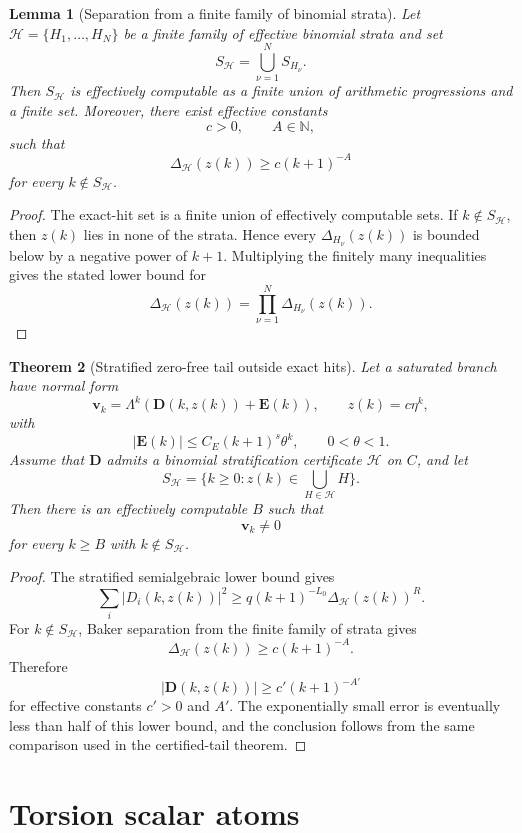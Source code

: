 \documentclass[11pt]{article}
\newtheorem{theorem}{Theorem}[section]
\newtheorem{lemma}[theorem]{Lemma}
\begin{document}
\begin{lemma}[Separation from a finite family of binomial strata]
Let \(\mathcal H=\{H_1,\ldots,H_N\}\) be a finite family of effective binomial strata and set
\[
S_{\mathcal H}=\bigcup_{\nu=1}^N S_{H_\nu}.
\]
Then \(S_{\mathcal H}\) is effectively computable as a finite union of arithmetic progressions and a finite set. Moreover, there exist effective constants
\[
c>0,
\qquad
A\in\mathbb N,
\]
such that
\[
\Delta_{\mathcal H}(z(k))\ge c(k+1)^{-A}
\]
for every \(k\notin S_{\mathcal H}\).
\end{lemma}

\begin{proof}
The exact-hit set is a finite union of effectively computable sets. If \(k\notin S_{\mathcal H}\), then \(z(k)\) lies in none of the strata. Hence every \(\Delta_{H_\nu}(z(k))\) is bounded below by a negative power of \(k+1\). Multiplying the finitely many inequalities gives the stated lower bound for
\[
\Delta_{\mathcal H}(z(k))
=
\prod_{\nu=1}^N\Delta_{H_\nu}(z(k)).
\]
\end{proof}

\begin{theorem}[Stratified zero-free tail outside exact hits]
Let a saturated branch have normal form
\[
\mathbf v_k=\Lambda^k(\mathbf D(k,z(k))+\mathbf E(k)),
\qquad
z(k)=c\eta^k,
\]
with
\[
|\mathbf E(k)|\le C_E(k+1)^s\theta^k,
\qquad
0<\theta<1.
\]
Assume that \(\mathbf D\) admits a binomial stratification certificate \(\mathcal H\) on \(C\), and let
\[
S_{\mathcal H}=\{k\ge0:z(k)\in\bigcup_{H\in\mathcal H}H\}.
\]
Then there is an effectively computable \(B\) such that
\[
\mathbf v_k\ne0
\]
for every \(k\ge B\) with \(k\notin S_{\mathcal H}\).
\end{theorem}

\begin{proof}
The stratified semialgebraic lower bound gives
\[
\sum_i|D_i(k,z(k))|^2
\ge
q(k+1)^{-L_0}\Delta_{\mathcal H}(z(k))^R.
\]
For \(k\notin S_{\mathcal H}\), Baker separation from the finite family of strata gives
\[
\Delta_{\mathcal H}(z(k))\ge c(k+1)^{-A}.
\]
Therefore
\[
|\mathbf D(k,z(k))|
\ge
c'(k+1)^{-A'}
\]
for effective constants \(c'>0\) and \(A'\). The exponentially small error is eventually less than half of this lower bound, and the conclusion follows from the same comparison used in the certified-tail theorem.
\end{proof}

\section{Torsion scalar atoms}
\end{document}
